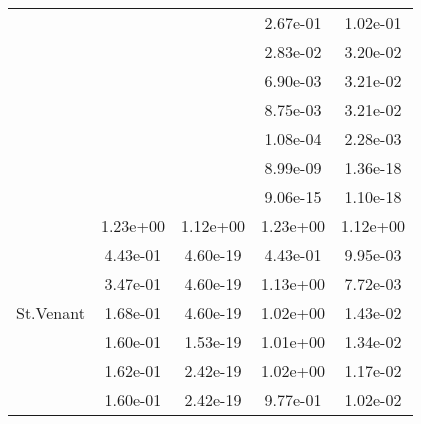 \begin{table}
\begin{tabular}{c|cc|cc|}
\multicolumn{1}{|c|}{} & \multicolumn{1}{|c|}{} & \multicolumn{1}{|c|}{} & \multicolumn{1}{|c|}{  2.67e-01} & \multicolumn{1}{|c|}{  1.02e-01} \\ 
\multicolumn{1}{|c|}{} & \multicolumn{1}{|c|}{} & \multicolumn{1}{|c|}{} & \multicolumn{1}{|c|}{  2.83e-02} & \multicolumn{1}{|c|}{  3.20e-02} \\ 
\multicolumn{1}{|c|}{} & \multicolumn{1}{|c|}{} & \multicolumn{1}{|c|}{} & \multicolumn{1}{|c|}{  6.90e-03} & \multicolumn{1}{|c|}{  3.21e-02} \\ 
\multicolumn{1}{|c|}{} & \multicolumn{1}{|c|}{} & \multicolumn{1}{|c|}{} & \multicolumn{1}{|c|}{  8.75e-03} & \multicolumn{1}{|c|}{  3.21e-02} \\ 
\multicolumn{1}{|c|}{} & \multicolumn{1}{|c|}{} & \multicolumn{1}{|c|}{} & \multicolumn{1}{|c|}{  1.08e-04} & \multicolumn{1}{|c|}{  2.28e-03} \\ 
\multicolumn{1}{|c|}{} & \multicolumn{1}{|c|}{} & \multicolumn{1}{|c|}{} & \multicolumn{1}{|c|}{  8.99e-09} & \multicolumn{1}{|c|}{  1.36e-18} \\ 
\multicolumn{1}{|c|}{} & \multicolumn{1}{|c|}{} & \multicolumn{1}{|c|}{} & \multicolumn{1}{|c|}{  9.06e-15} & \multicolumn{1}{|c|}{  1.10e-18} \\ 
\hline 
\multicolumn{1}{|c|}{\multirow{100}{*}{St.Venant}} &\multicolumn{1}{|c|}{  1.23e+00} & \multicolumn{1}{|c|}{  1.12e+00} & \multicolumn{1}{|c|}{  1.23e+00} & \multicolumn{1}{|c|}{  1.12e+00} \\ 
\multicolumn{1}{|c|}{} & \multicolumn{1}{|c|}{  4.43e-01} & \multicolumn{1}{|c|}{  4.60e-19} & \multicolumn{1}{|c|}{  4.43e-01} & \multicolumn{1}{|c|}{  9.95e-03} \\ 
\multicolumn{1}{|c|}{} & \multicolumn{1}{|c|}{  3.47e-01} & \multicolumn{1}{|c|}{  4.60e-19} & \multicolumn{1}{|c|}{  1.13e+00} & \multicolumn{1}{|c|}{  7.72e-03} \\ 
\multicolumn{1}{|c|}{} & \multicolumn{1}{|c|}{  1.68e-01} & \multicolumn{1}{|c|}{  4.60e-19} & \multicolumn{1}{|c|}{  1.02e+00} & \multicolumn{1}{|c|}{  1.43e-02} \\ 
\multicolumn{1}{|c|}{} & \multicolumn{1}{|c|}{  1.60e-01} & \multicolumn{1}{|c|}{  1.53e-19} & \multicolumn{1}{|c|}{  1.01e+00} & \multicolumn{1}{|c|}{  1.34e-02} \\ 
\multicolumn{1}{|c|}{} & \multicolumn{1}{|c|}{  1.62e-01} & \multicolumn{1}{|c|}{  2.42e-19} & \multicolumn{1}{|c|}{  1.02e+00} & \multicolumn{1}{|c|}{  1.17e-02} \\ 
\multicolumn{1}{|c|}{} & \multicolumn{1}{|c|}{  1.60e-01} & \multicolumn{1}{|c|}{  2.42e-19} & \multicolumn{1}{|c|}{  9.77e-01} & \multicolumn{1}{|c|}{  1.02e-02} \\ 

\end{tabular}
\end{table}

